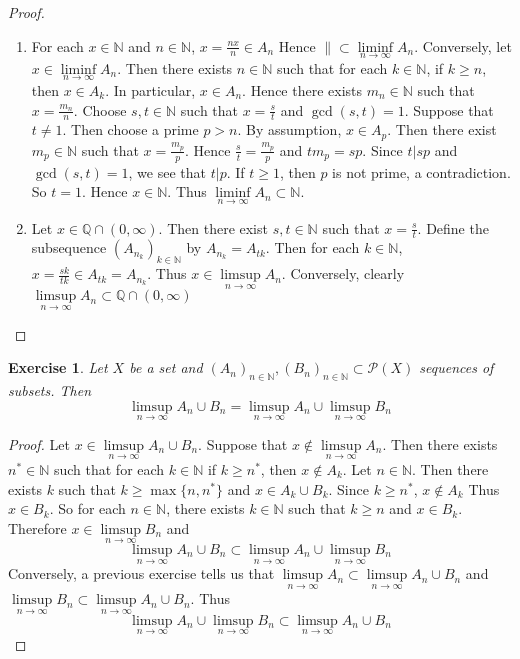 \documentclass[12pt]{amsart}
\newtheorem{ex}[thm]{Exercise}
\newcommand{\N}{\mathbb{N}}
\newcommand{\Q}{\mathbb{Q}}
\newcommand{\MP}{\mathcal{P}}
\begin{document}
	\begin{proof}\
		\begin{enumerate}
			\item For each $x \in \N$ and $n \in \N$, $x = \frac{nx}{n} \in A_n$ Hence $\|\subset \liminf\limits_{n \rightarrow \infty }A_n$. Conversely, let $x \in \liminf\limits_{n \rightarrow \infty }A_n$. Then there exists $n \in \N$ such that for each $k \in \N$, if $k \geq n$, then $x \in A_k$. In particular, $x \in A_n$. Hence there exists $m_n \in \N$ such that $x = \frac{m_n}{n}$. Choose $s,t \in \N$ such that $x= \frac{s}{t}$ and $\gcd(s,t) = 1$. Suppose that $t \neq 1$. Then choose a prime $p > n$. By assumption, $x \in A_p$. Then there exist $m_p \in \N$ such that $x = \frac{m_p}{p}$. Hence $\frac{s}{t} = \frac{m_p}{p}$ and $tm_p = sp$. Since $t \vert sp$ and $\gcd(s,t) = 1$, we see that $t \vert p$. If $t \geq 1$, then $p$ is not prime, a contradiction. So $t = 1$. Hence $x \in \N$. Thus $\liminf\limits_{n \rightarrow \infty }A_n \subset \N$. 
			\item Let $x \in \Q \cap (0, \infty)$. Then there exist $s,t \in \N$ such that $x = \frac{s}{t}$. Define the subsequence $(A_{n_k})_{k \in \N}$ by $A_{n_k} = A_{tk}$. Then for each $k \in \N$, $x = \frac{sk}{tk} \in A_{tk} = A_{n_k}$. Thus $x \in \limsup\limits_{n \rightarrow \infty }A_n$. Conversely, clearly $\limsup\limits_{n \rightarrow \infty }A_n \subset \Q \cap (0, \infty)$ 
		\end{enumerate}
	\end{proof}
	
	\begin{ex}
		Let $X$ be a set and $(A_n)_{n \in \N}, (B_n)_{n \in \N} \subset \MP(X)$ sequences of subsets. Then $$\limsup\limits_{n \rightarrow \infty} A_n \cup B_n= \limsup\limits_{n \rightarrow \infty} A_n \cup \limsup\limits_{n \rightarrow \infty} B_n$$
	\end{ex}
	
	\begin{proof}
		Let $x \in \limsup\limits_{n \rightarrow \infty} A_n \cup B_n$. Suppose that $x \not \in \limsup\limits_{n \rightarrow \infty} A_n$. Then there exists $n^* \in \N$ such that for each $k \in \N$ if $ k \geq n^*$, then $x \not \in A_k$. Let $n \in \N$. Then there exists $k$ such that $k \geq \max\{n, n^*\}$ and $x \in A_{k} \cup B_k$. Since $k \geq n^*$, $x \not \in A_{k}$ Thus $x \in B_k$. So for each $n \in \N$, there exists $k \in \N$ such that $k \geq n$ and $x \in B_k$. Therefore $x \in \limsup\limits_{n \rightarrow \infty}  B_n$ and $$\limsup\limits_{n \rightarrow \infty} A_n \cup B_n \subset \limsup\limits_{n \rightarrow \infty} A_n \cup \limsup\limits_{n \rightarrow \infty} B_n$$ Conversely, a previous exercise tells us that $\limsup\limits_{n \rightarrow \infty} A_n \subset \limsup\limits_{n \rightarrow \infty} A_n \cup B_n$ and $\limsup\limits_{n \rightarrow \infty}  B_n \subset \limsup\limits_{n \rightarrow \infty} A_n \cup B_n$. Thus $$ \limsup\limits_{n \rightarrow \infty} A_n \cup \limsup\limits_{n \rightarrow \infty} B_n \subset \limsup\limits_{n \rightarrow \infty} A_n \cup B_n$$
	\end{proof}
	
\end{document}
